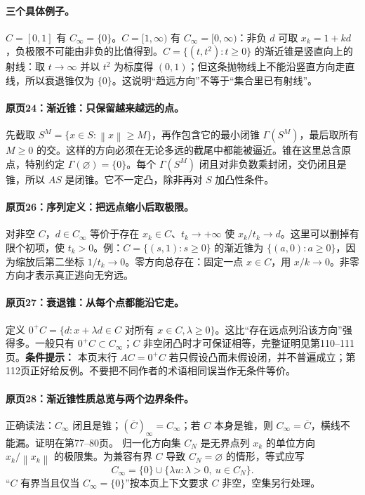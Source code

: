 \documentclass[11pt,a4paper]{article}
\newcommand{\norm}[1]{\left\lVert#1\right\rVert}
\theoremstyle{definition}\newtheorem{definition}{定义}\newtheorem{example}{例}
\begin{document}
\paragraph{三个具体例子。}
$C=[0,1]$ 有 $C_\infty=\{0\}$。$C=[1,\infty)$ 有 $C_\infty=[0,\infty)$：非负 $d$ 可取 $x_k=1+kd$，负极限不可能由非负的比值得到。$C=\{(t,t^2):t\ge0\}$ 的渐近锥是竖直向上的射线：取 $t\to\infty$ 并以 $t^2$ 为标度得 $(0,1)$；但这条抛物线上不能沿竖直方向走直线，所以衰退锥仅为 $\{0\}$。这说明“趋远方向”不等于“集合里已有射线”。


\paragraph{原页24：渐近锥：只保留越来越远的点。}先截取 $S^M=\{x\in S:\norm x\ge M\}$，再作包含它的最小闭锥 $\Gamma(S^M)$，最后取所有 $M\ge0$ 的交。这样的方向必须在无论多远的截尾中都能被逼近。锥在这里总含原点，特别约定 $\Gamma(\varnothing)=\{0\}$。每个 $\Gamma(S^M)$ 闭且对非负数乘封闭，交仍闭且是锥，所以 $AS$ 是闭锥。它不一定凸，除非再对 $S$ 加凸性条件。



\paragraph{原页26：序列定义：把远点缩小后取极限。}对非空 $C$，$d\in C_\infty$ 等价于存在 $x_k\in C$、$t_k\to+\infty$ 使 $x_k/t_k\to d$。这里可以删掉有限个初项，使 $t_k>0$。例：$C=\{(s,1):s\ge0\}$ 的渐近锥为 $\{(a,0):a\ge0\}$，因为缩放后第二坐标 $1/t_k\to0$。零方向总存在：固定一点 $x\in C$，用 $x/k\to0$。非零方向才表示真正逃向无穷远。



\paragraph{原页27：衰退锥：从每个点都能沿它走。}定义 $0^+C=\{d:x+\lambda d\in C\text{ 对所有 }x\in C,\lambda\ge0\}$。这比“存在远点列沿该方向”强得多。一般只有 $0^+C\subset C_\infty$；$C$ 非空闭凸时才可保证相等，完整证明见第110--111页。\textbf{条件提示：} 本页末行 $AC=0^+C$ 若只假设凸而未假设闭，并不普遍成立；第112页正好给反例。不要把不同作者的术语相同误当作无条件等价。



\paragraph{原页28：渐近锥性质总览与两个边界条件。}正确读法：$C_\infty$ 闭且是锥；$(\overline C)_\infty=C_\infty$；若 $C$ 本身是锥，则 $C_\infty=\overline C$，横线不能漏。证明在第77--80页。
归一化方向集 $C_N$ 是无界点列 $x_k$ 的单位方向 $x_k/\norm{x_k}$ 的极限集。为兼容有界 $C$ 导致 $C_N=\varnothing$ 的情形，等式应写
\[C_\infty=\{0\}\cup\{\lambda u:\lambda>0,\ u\in C_N\}.\]
“$C$ 有界当且仅当 $C_\infty=\{0\}$”按本页上下文要求 $C$ 非空，空集另行处理。
\end{document}
